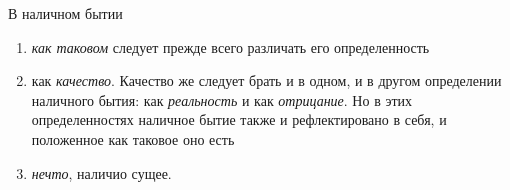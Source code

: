В наличном бытии

\begin{enumerate}[label=\alph*)]
\item \emph{как таковом} следует прежде всего различать его
определенность
\item как \emph{качество}. Качество же следует брать и в одном,
и в другом определении наличного бытия: как \emph{реальность}
и как \emph{отрицание}. Но в этих определенностях наличное бытие
также и рефлектировано в себя, и положенное как
таковое оно есть
\item \emph{нечто}, наличио сущее.
\end{enumerate}


